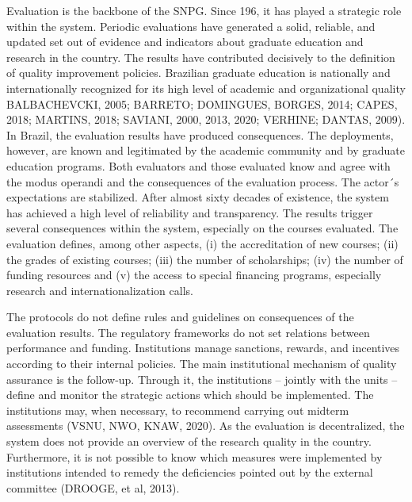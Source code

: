 Evaluation is the backbone of the SNPG. Since 196, it has played a strategic role within the system. Periodic evaluations have generated a solid, reliable, and updated set out of evidence and indicators about graduate education and research in the country. The results have contributed decisively to the definition of quality improvement policies. Brazilian graduate education is nationally and internationally recognized for its high level of academic and organizational quality BALBACHEVCKI, 2005; BARRETO; DOMINGUES, BORGES, 2014; CAPES, 2018; MARTINS, 2018; SAVIANI, 2000, 2013, 2020; VERHINE; DANTAS, 2009). In Brazil, the evaluation results have produced consequences. The deployments, however, are known and legitimated by the academic community and by graduate education programs. Both evaluators and those evaluated know and agree with the modus operandi and the consequences of the evaluation process. The actor´s expectations are stabilized. After almost sixty decades of existence, the system has achieved a high level of reliability and transparency. The results trigger several consequences within the system, especially on the courses evaluated. The evaluation defines, among other aspects, (i) the accreditation of new courses; (ii) the grades of existing courses; (iii) the number of scholarships; (iv) the number of funding resources and (v) the access to special financing programs, especially research and internationalization calls.  

The protocols do not define rules and guidelines on consequences of the evaluation results. The regulatory frameworks do not set relations between performance and funding. Institutions manage sanctions, rewards, and incentives according to their internal policies. The main institutional mechanism of quality assurance is the follow-up. Through it, the institutions – jointly with the units – define and monitor the strategic actions which should be implemented. The institutions may, when necessary, to recommend carrying out midterm assessments (VSNU, NWO, KNAW, 2020). As the evaluation is decentralized, the system does not provide an overview of the research quality in the country. Furthermore, it is not possible to know which measures were implemented by institutions intended to remedy the deficiencies pointed out by the external committee (DROOGE, et al, 2013).  




